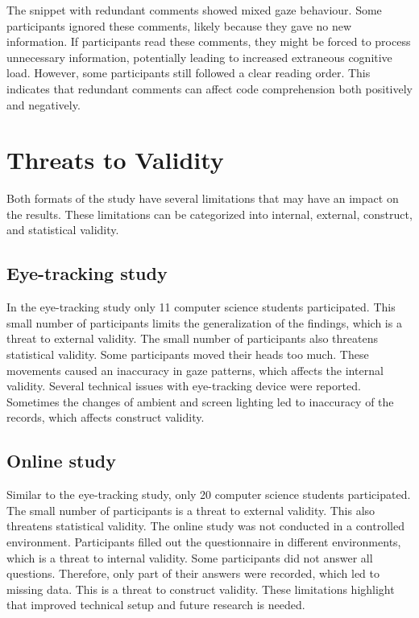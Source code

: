 The snippet with redundant comments showed mixed gaze behaviour.  Some participants ignored these comments, likely because they gave no new information. If participants read these comments, they might be forced to process unnecessary information, potentially leading to increased extraneous cognitive load.  However, some participants still followed a clear reading order. This indicates that redundant comments can affect code comprehension both positively and negatively.  



\section{Threats to Validity} 
Both formats of the study have several limitations that may have an impact on the results. These limitations can be categorized into internal, external, construct, and statistical validity.

\subsection{Eye-tracking study} 

In the eye-tracking study only 11 computer science students participated. This small number of participants limits the generalization of the findings, which is a threat to external validity. The small number of participants also threatens statistical validity. Some participants moved their heads too much. These movements caused an inaccuracy in gaze patterns, which affects the internal validity. Several technical issues with eye-tracking device were reported. Sometimes the changes of ambient and screen lighting led to inaccuracy of the records, which affects construct validity.


\subsection{Online study} 

Similar to the eye-tracking study, only 20 computer science students participated. The small number of participants is a threat to external validity. This also threatens statistical validity. The online study was not conducted in a controlled environment. Participants filled out the questionnaire in different environments, which is a threat to internal validity.
Some participants did not answer all questions. Therefore, only part of their answers were recorded, which led to missing data. This is a threat to construct validity.
These limitations highlight that improved technical setup and future research is needed.



